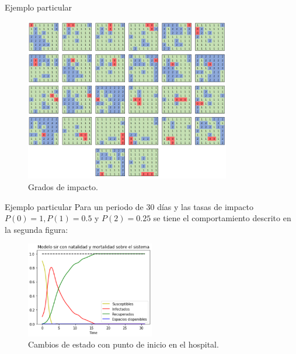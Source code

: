 \documentclass[9pt]{beamer}
\begin{document}
\begin{frame}{Ejemplo particular}
\begin{figure}[h]
  \centering
    \includegraphics[width=0.8\textwidth]{Imagenes/vecindadesCap4.PNG}
    \caption{Grados de impacto.}
    \label{fig:GradosdeImpactoEX4}
\end{figure}
\end{frame}

\begin{frame}{Ejemplo particular}
Para un periodo de 30 días y las tasas de impacto $P(0)=1,P(1)=0.5$ y $P(2)=0.25$ se tiene el comportamiento descrito en la segunda figura:
\begin{figure}[h]
  \centering
    \includegraphics[width=0.5\textwidth]{Imagenes/metricas1.PNG}
    \caption{Cambios de estado con punto de inicio en el hospital.}
    \label{fig:metricas1}
\end{figure}
\end{frame}
\end{document}
